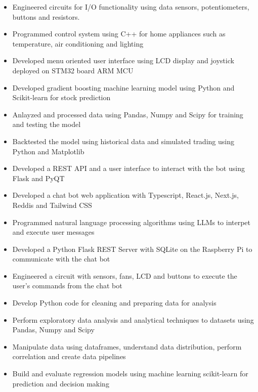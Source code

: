 \documentclass[11pt,a4paper,ragged2e]{altacv}
\begin{document}
\begin{paracol}{1}
\begin{itemize}
\item Engineered circuits for I/O functionality using data sensors, potentiometers, buttons and resistors.
\item Programmed control system using C++ for home appliances such as temperature, air conditioning and lighting 
\item Developed menu oriented user interface using LCD display and joystick deployed on STM32 board ARM MCU
\end{itemize}

\begin{itemize}
\item Developed gradient boosting machine learning model using Python and Scikit-learn for stock prediction
\item Anlayzed and processed data using Pandas, Numpy and Scipy for training and testing the model 
\item Backtested the model using historical data and simulated trading using Python and Matplotlib
\item Developed a REST API and a user interface to interact with the bot using Flask and PyQT
\end{itemize}

\begin{itemize}
\item Developed a chat bot web application with Typescript, React.js, Next.js, Reddis and Tailwind CSS
\item Programmed natural language processing algorithms using LLMs to interpet and execute user messages 
\item Developed a Python Flask REST Server with SQLite on the Raspberry Pi to communicate with the chat bot
\item Engineered a circuit with sensors, fans, LCD and buttons to execute the user's commands from the chat bot 
\end{itemize}

\medskip

\begin{itemize}
\item Develop Python code for cleaning and preparing data for analysis 
\item Perform exploratory data analysis and analytical techniques to datasets using Pandas, Numpy and Scipy
\item Manipulate data using dataframes, understand data distribution, perform correlation and create data pipelines
\item Build and evaluate regression models using machine learning scikit-learn for prediction and decision making
\end{itemize}
\tightdivider


\end{paracol}
\end{document}
